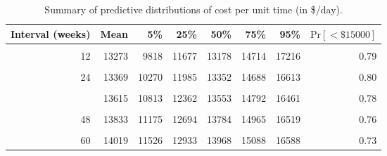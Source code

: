 \begin{table}
\centering
\caption{\label{tab:cost-per-unit-time}Summary of predictive distributions of cost per unit time (in \$/day).}
\centering
\begin{tabular}[t]{rrrrrrrr}
\toprule
Interval (weeks) & Mean & 5\% & 25\% & 50\% & 75\% & 95\% & $\text{Pr}[< \$15000]$\\
\midrule
\cellcolor{gray!10}{6} & \cellcolor{gray!10}{13857} & \cellcolor{gray!10}{10059} & \cellcolor{gray!10}{12060} & \cellcolor{gray!10}{13704} & \cellcolor{gray!10}{15491} & \cellcolor{gray!10}{18135} & \cellcolor{gray!10}{0.69}\\
12 & 13273 & 9818 & 11677 & 13178 & 14714 & 17216 & 0.79\\
\cellcolor{gray!10}{18} & \cellcolor{gray!10}{13267} & \cellcolor{gray!10}{10000} & \cellcolor{gray!10}{11811} & \cellcolor{gray!10}{13217} & \cellcolor{gray!10}{14622} & \cellcolor{gray!10}{16792} & \cellcolor{gray!10}{0.80}\\
24 & 13369 & 10270 & 11985 & 13352 & 14688 & 16613 & 0.80\\
\cellcolor{gray!10}{30} & \cellcolor{gray!10}{13498} & \cellcolor{gray!10}{10575} & \cellcolor{gray!10}{12219} & \cellcolor{gray!10}{13434} & \cellcolor{gray!10}{14724} & \cellcolor{gray!10}{16480} & \cellcolor{gray!10}{0.79}\\
\addlinespace
36 & 13615 & 10813 & 12362 & 13553 & 14792 & 16461 & 0.78\\
\cellcolor{gray!10}{42} & \cellcolor{gray!10}{13725} & \cellcolor{gray!10}{10984} & \cellcolor{gray!10}{12516} & \cellcolor{gray!10}{13649} & \cellcolor{gray!10}{14844} & \cellcolor{gray!10}{16498} & \cellcolor{gray!10}{0.77}\\
48 & 13833 & 11175 & 12694 & 13784 & 14965 & 16519 & 0.76\\
\cellcolor{gray!10}{54} & \cellcolor{gray!10}{13930} & \cellcolor{gray!10}{11362} & \cellcolor{gray!10}{12806} & \cellcolor{gray!10}{13872} & \cellcolor{gray!10}{15016} & \cellcolor{gray!10}{16525} & \cellcolor{gray!10}{0.75}\\
60 & 14019 & 11526 & 12933 & 13968 & 15088 & 16588 & 0.73\\
\bottomrule
\end{tabular}
\end{table}
